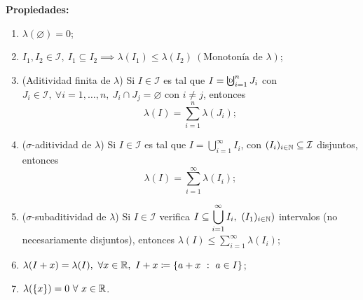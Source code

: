 \noindent \textbf{Propiedades:}
\begin{enumerate}
	\item $\lambda (\varnothing) = 0$;

	\item $I_1,I_2 \in \mathcal{I},\ I_1\subseteq I_2 \implies \lambda (I_1) \leq \lambda (I_2) \ (\text{Monotonía de } \lambda)$;

	\item (Aditividad finita de $\lambda$) Si $I \in \mathcal{I}$ es tal que $I = \textbigcupd_{i=1}^{n} J_i$ con $J_i \in \mathcal{I},\ \forall i = 1,\dots,n,\ J_i \cap J_j = \varnothing$ con $i\neq j$, entonces
	\[
	\lambda (I) = \sum_{i=1}^{n} \lambda (J_i);
	\]

	\item ($\sigma$-aditividad de $\lambda$) Si $I \in \mathcal{I}$ es tal que $I = \bigcup_{i=1}^{\infty} I_i $, con $(I_i)_{i \in \mathbb{N}} \subseteq \mathcal{I}$ disjuntos, entonces
	\[
	\lambda(I) = \sum_{i=1}^{\infty} \lambda (I_i)
	;\]

	\item ($\sigma$-subaditividad de $\lambda$) Si $I \in \mathcal{I}$ verifica $I \subseteq \displaystyle\bigcup_{i=1}^{\infty} I_i, \ (I_1)_{i \in \mathbb{N}})$ intervalos (no necesariamente disjuntos), entonces $\lambda (I) \leq \sum_{i=1}^{\infty} \lambda (I_i)$;

	\item $\lambda (I + x) = \lambda (I), \ \forall x \in \R, \ I+x \coloneq \{a + x \ : \ a \in I \} $;

	\item $\lambda(\{x\}) = 0 \ \forall \ x \in \mathbb{R}$.  
\end{enumerate}
